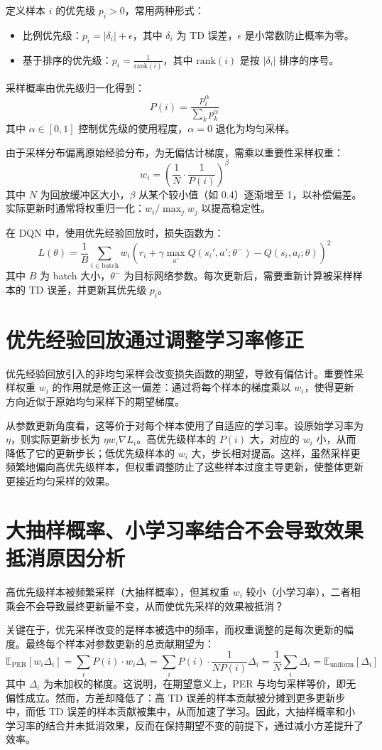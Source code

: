 \documentclass{article}
\begin{document}
定义样本 \(i\) 的优先级 \(p_i > 0\)，常用两种形式：
\begin{itemize}
    \item 比例优先级：\(p_i = |\delta_i| + \epsilon\)，其中 \(\delta_i\) 为 TD 误差，\(\epsilon\) 是小常数防止概率为零。
    \item 基于排序的优先级：\(p_i = \frac{1}{\text{rank}(i)}\)，其中 \(\text{rank}(i)\) 是按 \(|\delta_i|\) 排序的序号。
\end{itemize}
采样概率由优先级归一化得到：
\[
P(i) = \frac{p_i^\alpha}{\sum_k p_k^\alpha}
\tag{13}
\]
其中 \(\alpha \in [0,1]\) 控制优先级的使用程度，\(\alpha=0\) 退化为均匀采样。

由于采样分布偏离原始经验分布，为无偏估计梯度，需乘以重要性采样权重：
\[
w_i = \left( \frac{1}{N} \cdot \frac{1}{P(i)} \right)^\beta
\]
其中 \(N\) 为回放缓冲区大小，\(\beta\) 从某个较小值（如 0.4）逐渐增至 1，以补偿偏差。实际更新时通常将权重归一化：\(w_i / \max_j w_j\) 以提高稳定性。

在 DQN 中，使用优先经验回放时，损失函数为：
\[
L(\theta) = \frac{1}{B} \sum_{i \in \text{batch}} w_i \left( r_i + \gamma \max_{a'} Q(s_i', a'; \theta^-) - Q(s_i, a_i; \theta) \right)^2
\tag{14}
\]
其中 \(B\) 为 batch 大小，\(\theta^-\) 为目标网络参数。每次更新后，需要重新计算被采样样本的 TD 误差，并更新其优先级 \(p_i\)。

\section{优先经验回放通过调整学习率修正}
优先经验回放引入的非均匀采样会改变损失函数的期望，导致有偏估计。重要性采样权重 \(w_i\) 的作用就是修正这一偏差：通过将每个样本的梯度乘以 \(w_i\)，使得更新方向近似于原始均匀采样下的期望梯度。

从参数更新角度看，这等价于对每个样本使用了自适应的学习率。设原始学习率为 \(\eta\)，则实际更新步长为 \(\eta w_i \nabla L_i\)。高优先级样本的 \(P(i)\) 大，对应的 \(w_i\) 小，从而降低了它的更新步长；低优先级样本的 \(w_i\) 大，步长相对提高。这样，虽然采样更频繁地偏向高优先级样本，但权重调整防止了这些样本过度主导更新，使整体更新更接近均匀采样的效果。

\section{大抽样概率、小学习率结合不会导致效果抵消原因分析}
高优先级样本被频繁采样（大抽样概率），但其权重 \(w_i\) 较小（小学习率），二者相乘会不会导致最终更新量不变，从而使优先采样的效果被抵消？

关键在于，优先采样改变的是样本被选中的频率，而权重调整的是每次更新的幅度。最终每个样本对参数更新的总贡献期望为：
\[
\mathbb{E}_{\text{PER}}[w_i \Delta_i] = \sum_i P(i) \cdot w_i \Delta_i = \sum_i P(i) \cdot \frac{1}{N P(i)} \Delta_i = \frac{1}{N} \sum_i \Delta_i = \mathbb{E}_{\text{uniform}}[\Delta_i]
\tag{15}
\]
其中 \(\Delta_i\) 为未加权的梯度。这说明，在期望意义上，PER 与均匀采样等价，即无偏性成立。然而，方差却降低了：高 TD 误差的样本贡献被分摊到更多更新步中，而低 TD 误差的样本贡献被集中，从而加速了学习。因此，大抽样概率和小学习率的结合并未抵消效果，反而在保持期望不变的前提下，通过减小方差提升了效率。
\end{document}
